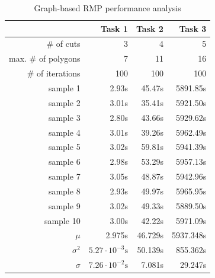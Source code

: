 \documentclass[11pt,a4paper,twoside,openright]{report}
\begin{document}
\begin{table}[p]
\centering
\caption{Graph-based RMP performance analysis}
\label{tab:graphperformanceanalysis}
\begin{tabular}{|r|r|r|r|}
\hline
 & Task 1 & Task 2 & Task 3 \\ \hline
\# of cuts & 3 & 4 & 5 \\ \hline
max. \# of polygons & 7 & 11 & 16 \\ \hline
\# of iterations & 100 & 100 & 100 \\ \hline
sample 1 & 2.93s & 45.47s & 5891.85s \\ \hline
sample 2 & 3.01s & 35.41s & 5921.50s \\ \hline
sample 3 & 2.80s & 43.66s & 5929.62s \\ \hline
sample 4 & 3.01s & 39.26s & 5962.49s \\ \hline
sample 5 & 3.02s & 59.81s & 5941.39s \\ \hline
sample 6 & 2.98s & 53.29s & 5957.13s \\ \hline
sample 7 & 3.05s & 48.87s & 5942.96s \\ \hline
sample 8 & 2.93s & 49.97s & 5965.95s \\ \hline
sample 9 & 3.02s & 49.33s & 5889.50s \\ \hline
sample 10 & 3.00s & 42.22s & 5971.09s \\ \hline
$\mu$ & 2.975s & 46.729s & 5937.348s \\ \hline
$\sigma^2$ & $5.27 \cdot 10^{-3}\textrm{s}$ & 50.139s & 855.362s \\ \hline
$\sigma$ & $7.26 \cdot 10^{-2}\textrm{s}$ & 7.081s & 29.247s \\ \hline
\end{tabular}
\end{table}
\end{document}
